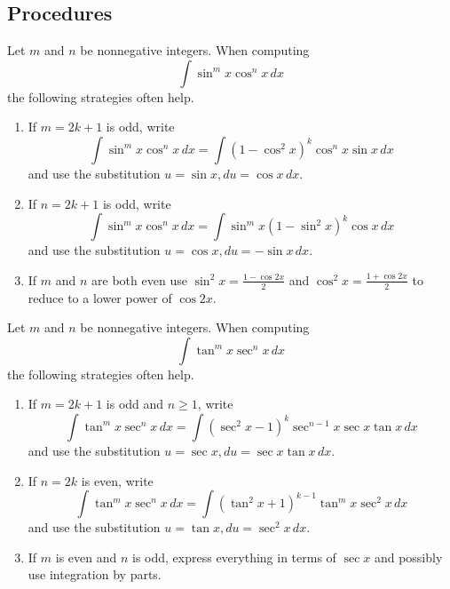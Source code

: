 
\subsection*{Procedures}
\begin{comment}
The basic strategy for computing integrals of functions of the form $\sin^m x\cos^n x$ or $\tan^m x\sec^n x$ is to use one of the four substitutions
\begin{align*}
  u&=\sin x & u&=\cos x & u&=\tan x & u&=\sec x \\
  du&=\cos x\, dx & du&=-\sin x\, dx & du&=\sec^2 x\, dx & du&=\sec x\tan x\, dx,
\end{align*}
``peel off" what is necessary for $du$, and express the rest of the integrand as a polynomial in $u$ using the trigonometric identities.
\begin{align*}
\sin^2 x+\cos^2 x&=1 & \sec^2 x&=\tan^2+1.
\end{align*}
\end{comment}
\begin{namedtheorem} Let $m$ and $n$ be nonnegative integers. When computing
  \[
  \int \sin^m x\cos^n x\, dx
  \]
  the following strategies often help.
  \begin{enumerate}
    \item If $m=2k+1$ is odd, write
    \[
    \int \sin^m x\cos^n x\, dx=\int (1-\cos^2x)^k\cos^n x\sin x\, dx
    \]
    and use the substitution $u=\sin x, du=\cos x\, dx$.
    \item If $n=2k+1$ is odd, write
    \[
    \int \sin^m x\cos^n x\, dx=\int \sin^m x(1-\sin^2x)^k\cos x \, dx
    \]
    and use the substitution $u=\cos x, du=-\sin x\, dx$.
    \item If $m$ and $n$ are both even use $\displaystyle\sin^2 x=\frac{1-\cos 2x}{2}$ and $\displaystyle\cos^2 x=\frac{1+\cos 2x}{2}$ to reduce to a lower power of $\cos 2x$.
  \end{enumerate}

\end{namedtheorem}
\newpage
\begin{namedtheorem} Let $m$ and $n$ be nonnegative integers. When computing
  \[
  \int \tan^m x\sec^n x \, dx
  \]
  the following strategies often help.
  \begin{enumerate}
    \item If $m=2k+1$ is odd and $n\geq 1$, write
    \[
    \int \tan^m x\sec^n x \, dx=\int (\sec^2 x-1)^k\sec^{n-1} x\sec x\tan x \, dx
    \]
    and use the substitution $u=\sec x, du=\sec x\tan x\, dx$.
    \item If $n=2k$ is even, write
    \[
    \int \tan^m x\sec^n x \, dx=\int (\tan^2 x+1)^{k-1}\tan^m x\sec^2 x\, dx
    \]
    and use the substitution $u=\tan x, du=\sec^2 x\, dx$.

    \item If $m$ is even and $n$ is odd, express everything in terms of $\sec x$ and possibly use integration by parts.
  \end{enumerate}

\end{namedtheorem}

